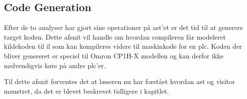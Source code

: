 \subsection{Code Generation}\label{ssec:codegen}
Efter de to analyser har gjort sine operationer på \gls{ast}'et er det tid til at generere target koden. Dette afsnit vil handle om hvordan compileren får modeleret kildekoden til \gls{il} som kan kompileres videre til maskinkode for en \gls{plc}. Koden der bliver genereret er speciel til Omron CP1H-X modellen og kan derfor ikke nødvendigvis køre på andre \gls{plc}'er.

Til dette afsnit forventes det at læseren nu har forstået hvordan \acrlong{ast} og visitor mønstret, da det er blevet beskrevet tidligere i kapitlet. 


\bigskip
